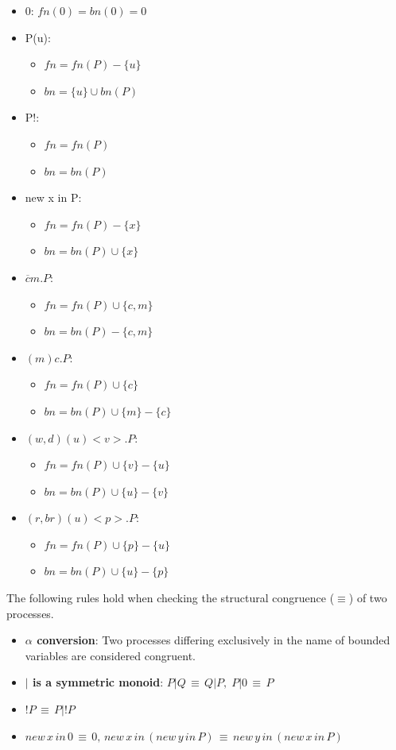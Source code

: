 \begin{itemize}
\item 0: $fn(0) = bn(0) = 0 $
\item P(u):
  \begin{itemize}
    \item $fn = fn(P) - \{ u \}$
    \item $bn = \{u\} \cup bn(P)$
  \end{itemize}
\item P!:
  \begin{itemize}
    \item $fn = fn(P)$
    \item $bn = bn(P)$
  \end{itemize}
\item new x in P:
  \begin{itemize}
    \item $fn = fn(P) - \{ x \}$
    \item $bn = bn(P) \cup \{x\} $
  \end{itemize}
\item $\overline{c}m.P$:
  \begin{itemize}
    \item $fn = fn(P) \cup \{ c, m \}$
    \item $bn = bn(P) - \{ c, m\}$
  \end{itemize}
\item $(m)c.P$:
  \begin{itemize}
    \item $fn = fn(P) \cup \{ c\}$
    \item $bn = bn(P) \cup \{ m \} - \{ c\}$
  \end{itemize}
\item $(w,d)(u)<v>.P$:
  \begin{itemize}
    \item $fn = fn(P) \cup \{ v \} - \{ u \}$
    \item $bn = bn(P) \cup \{ u \} - \{ v\}$
  \end{itemize}
\item $(r,br)(u)<p>.P$:
  \begin{itemize}
    \item $fn = fn(P) \cup \{ p \} - \{ u \}$
    \item $bn = bn(P) \cup \{ u \} - \{ p\}$
  \end{itemize}
\end{itemize}
The following rules hold when checking the structural congruence ($\equiv$) of two processes.
\begin{itemize}
  \item{\bf $\alpha$ conversion}: Two processes differing exclusively in the name of bounded variables are considered congruent.
  \item{\bf $|$ is a symmetric monoid}: $P|Q\,\equiv\,Q|P,\;P|0\,\equiv\,P$
  \item $!P\,\equiv\,P|!P$
  \item $new\,x\,in\,0\,\equiv\,0,\,new\,x\,in\,(new\,y\,in\,P)\,\equiv\,new\,y\,in\,(new\,x\,in\,P)$
\end{itemize}
